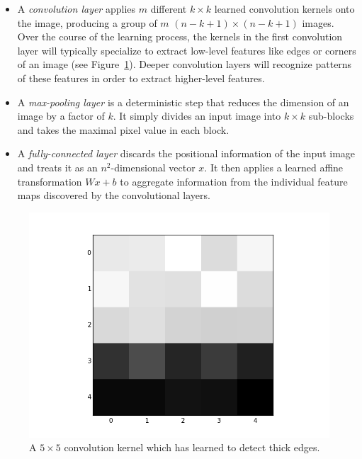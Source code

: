 \documentclass{article}
\begin{document}
  \begin{itemize}
    \item A \emph{convolution layer} applies $m$ different $k\times k$ learned convolution kernels onto the image, producing a group of $m$ $(n-k+1) \times (n-k+1)$ images. Over the course of the learning process, the kernels in the first convolution layer will typically specialize to extract low-level features like edges or corners of an image (see Figure~\ref{kernels}). Deeper convolution layers will recognize patterns of these features in order to extract higher-level features.

    \item A \emph{max-pooling layer} is a deterministic step that reduces the dimension of an image by a factor of $k$. It simply divides an input image into $k \times k$ sub-blocks and takes the maximal pixel value in each block.

    \item A \emph{fully-connected layer} discards the positional information of the input image and treats it as an $n^2$-dimensional vector $x$. It then applies a learned affine transformation $Wx + b$ to aggregate information from the individual feature maps discovered by the convolutional layers.
  \end{itemize}

  \begin{figure}[h]
    \centering
    \includegraphics[scale=0.25]{img/Solid0-4.png}
    \caption{A $5\times 5$ convolution kernel which has learned to detect thick edges.}\label{kernels}
  \end{figure}
\end{document}
